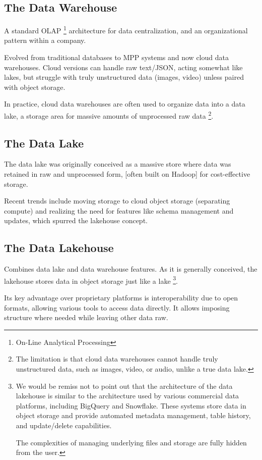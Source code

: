 \subsection*{The Data Warehouse}
A standard OLAP
\footnote{
    On-Line Analytical Processing
}
architecture for data centralization, and an organizational pattern
within a company.

Evolved from traditional databases to MPP systems and now cloud data
warehouses. Cloud versions can handle raw text/JSON, acting somewhat
like lakes, but struggle with truly unstructured data (images, video)
unless paired with object storage.

In practice, cloud data warehouses are often used to organize data
into a data lake, a storage area for massive amounts of unprocessed
raw data
\footnote{
    The limitation is that cloud data warehouses cannot handle truly
    unstructured data, such as images, video, or audio, unlike a true
    data lake.
}.


\subsection*{The Data Lake}
The data lake was originally conceived as a massive store where data
was retained in raw and unprocessed form, [often built on Hadoop]
for cost-effective storage.

Recent trends include moving storage to cloud object storage
(separating compute) and realizing the need for features like
schema management and updates, which spurred the lakehouse concept.


\subsection*{The Data Lakehouse}
Combines data lake and data warehouse features. As it is generally
conceived, the lakehouse stores data in object storage just like
a lake
\footnote{
    We would be remiss not to point out that the architecture of
    the data lakehouse is similar to the architecture used by
    various commercial data platforms, including BigQuery and
    Snowflake. These systems store data in object storage and
    provide automated metadata management, table history,
    and update/delete capabilities.
    
    The complexities of managing underlying files and storage are
    fully hidden from the user.
}.

Its key advantage over proprietary platforms is interoperability
due to open formats, allowing various tools to access data
directly. It allows imposing structure where needed while leaving
other data raw.



